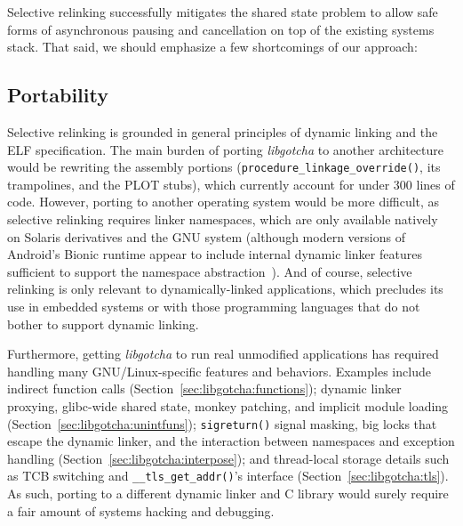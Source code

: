 Selective relinking successfully mitigates the shared state problem to allow safe
forms of asynchronous pausing and cancellation on top of the existing systems stack.
That said, we should emphasize a few shortcomings of our approach:


\subsection{Portability}
\label{sec:libgotcha:portability}

Selective relinking is grounded in general principles of dynamic linking and the ELF
specification.  The main burden of porting \textit{libgotcha} to another architecture
would be rewriting the assembly portions (\texttt{procedure\_linkage\_override()},
its trampolines, and the PLOT stubs), which currently account for under 300 lines of
code.  However, porting to another operating system would be more difficult, as
selective relinking requires linker namespaces, which are only available natively on
Solaris derivatives and the GNU system (although modern versions of Android's Bionic
runtime appear to include internal dynamic linker features sufficient to support the
namespace abstraction~\cite{www-bionic-bypass}).  And of course, selective relinking
is only relevant to dynamically-linked applications, which precludes its use in
embedded systems or with those programming languages that do not bother to support
dynamic linking.

Furthermore, getting \textit{libgotcha} to run real unmodified applications has
required handling many GNU/Linux-specific features and behaviors.  Examples include
indirect function calls (Section~\ref{sec:libgotcha:functions}); dynamic linker
proxying, glibc-wide shared state, monkey patching, and implicit module loading
(Section~\ref{sec:libgotcha:unintfuns}); \texttt{sigreturn()} signal masking, big
locks that escape the dynamic linker, and the interaction between namespaces and
exception handling (Section~\ref{sec:libgotcha:interpose}); and thread-local storage
details such as TCB switching and \texttt{\_\_tls\_get\_addr()}'s interface
(Section~\ref{sec:libgotcha:tls}).  As such, porting to a different dynamic linker
and C library would surely require a fair amount of systems hacking and debugging.

